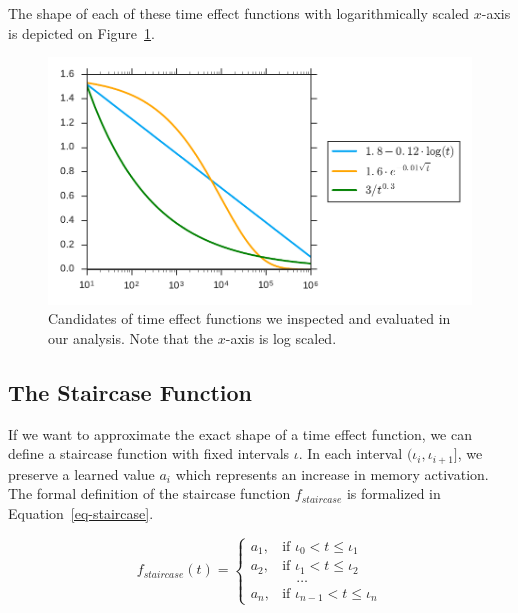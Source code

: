The shape of each of these time effect functions with logarithmically scaled $x$-axis is depicted on Figure~\ref{fig-time-effect-functions}.

\begin{figure}[htbp]
  \centering
  \includegraphics[width=\textwidth]{img/time-effect-functions}
  \caption{Candidates of time effect functions we inspected and evaluated in our analysis. Note that the $x$-axis is log scaled.}
  \label{fig-time-effect-functions}
\end{figure}

\subsection{The Staircase Function}
\label{staircase-function}

If we want to approximate the exact shape of a time effect function, we can define a staircase function with fixed intervals $\iota$. In each interval $(\iota_i, \iota_{i+1}]$, we preserve a learned value $a_i$ which represents an increase in memory activation. The formal definition of the staircase function $f_{\mathit{staircase}}$ is formalized in Equation~\ref{eq-staircase}.

\begin{equation} \label{eq-staircase}
  f_{\mathit{staircase}}(t) = \begin{cases}
            a_1, & \text{if } \iota_0 < t \leq \iota_1 \\
            a_2, & \text{if } \iota_1 < t \leq \iota_2 \\
                 & \hspace{1em} \dots \\
            a_n, & \text{if } \iota_{n-1} < t \leq \iota_n
         \end{cases}
\end{equation}

